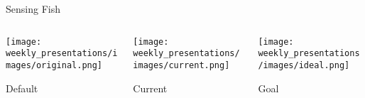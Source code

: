 \begin{frame}{Sensing Fish}
    \begin{columns}
        \begin{column}{0.33\textwidth}
            \texttt{[image: weekly\_presentations/images/original.png]}
            \caption{Default}
        \end{column}
        \begin{column}{0.33\textwidth}
            \texttt{[image: weekly\_presentations/images/current.png]}
            \caption{Current}
        \end{column}
        \begin{column}{0.33\textwidth}
            \texttt{[image: weekly\_presentations/images/ideal.png]}
            \caption{Goal}
        \end{column}
        
    \end{columns}

\end{frame}
